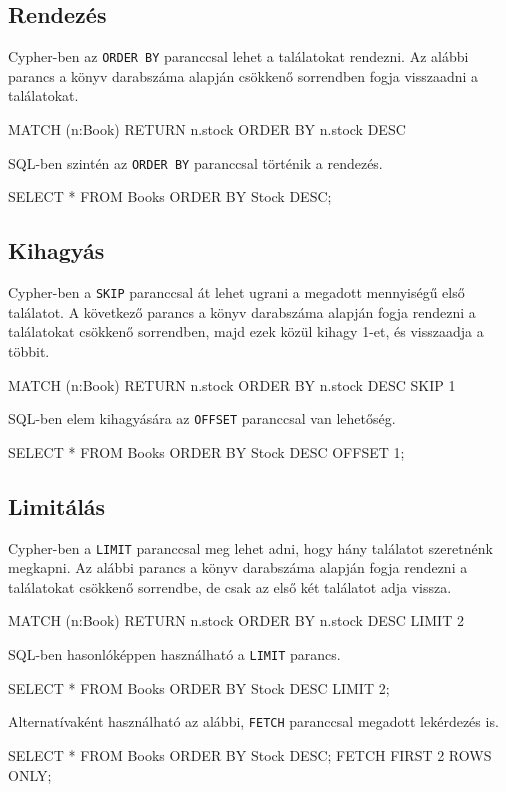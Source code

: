 \subsection{Rendezés}
Cypher-ben az \texttt{ORDER BY} paranccsal lehet a találatokat rendezni. Az alábbi parancs a könyv darabszáma alapján csökkenő sorrendben fogja visszaadni a találatokat.
\begin{java}
MATCH (n:Book) 
RETURN n.stock 
ORDER BY n.stock DESC
\end{java}
SQL-ben szintén az \texttt{ORDER BY} paranccsal történik a rendezés.
\begin{java}
SELECT * 
FROM Books 
ORDER BY Stock DESC;
\end{java}

\subsection{Kihagyás}
Cypher-ben a \texttt{SKIP} paranccsal át lehet ugrani a megadott mennyiségű első találatot. A következő parancs a könyv darabszáma alapján fogja rendezni a találatokat csökkenő sorrendben, majd ezek közül kihagy 1-et, és visszaadja a többit.
\begin{java}
MATCH (n:Book) 
RETURN n.stock 
ORDER BY n.stock DESC
SKIP 1
\end{java}
SQL-ben elem kihagyására az \texttt{OFFSET} paranccsal van lehetőség.
\begin{java}
SELECT * 
FROM Books 
ORDER BY Stock DESC
OFFSET 1;
\end{java}

\subsection{Limitálás}
Cypher-ben a \texttt{LIMIT} paranccsal meg lehet adni, hogy hány találatot szeretnénk megkapni. Az alábbi parancs a könyv darabszáma alapján fogja rendezni a találatokat csökkenő sorrendbe, de csak az első két találatot adja vissza.
\begin{java}
MATCH (n:Book) 
RETURN n.stock 
ORDER BY n.stock DESC
LIMIT 2
\end{java}
SQL-ben hasonlóképpen használható a \texttt{LIMIT} parancs.
\begin{java}
SELECT *
FROM Books 
ORDER BY Stock DESC
LIMIT 2;
\end{java}
Alternatívaként használható az alábbi, \texttt{FETCH} paranccsal megadott lekérdezés is.
\begin{java}
SELECT *
FROM Books 
ORDER BY Stock DESC;
FETCH FIRST 2 ROWS ONLY;
\end{java}

